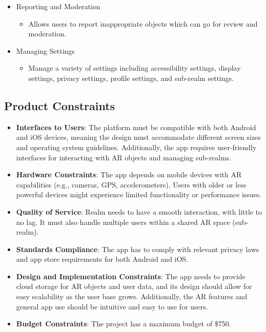 \documentclass{article}
\begin{document}
\begin{itemize}
    \item Reporting and Moderation
          \begin{itemize}
              \item Allows users to report inappropriate objects which can go for review and moderation.
          \end{itemize}

    \item Managing Settings
          \begin{itemize}
              \item Manage a variety of settings including accessibility settings, display settings, privacy settings, profile settings, and sub-realm settings.
          \end{itemize}
\end{itemize}
\subsection{Product Constraints}

\begin{itemize}
    \item \textbf{Interfaces to Users}: The platform must be compatible with both Android and iOS devices, meaning the design must accommodate different screen sizes and operating system guidelines. Additionally, the app requires user-friendly interfaces for interacting with AR objects and managing sub-realms.

    \item \textbf{Hardware Constraints}: The app depends on mobile devices with AR capabilities (e.g., cameras, GPS, accelerometers). Users with older or less powerful devices might experience limited functionality or performance issues.

    \item \textbf{Quality of Service}: Realm needs to have a smooth interaction, with little to no lag. It must also handle multiple users within a shared AR space (sub-realm).

    \item \textbf{Standards Compliance}: The app has to comply with relevant privacy laws and app store requirements for both Android and iOS.

    \item \textbf{Design and Implementation Constraints}: The app needs to provide cloud storage for AR objects and user data, and its design should allow for easy scalability as the user base grows. Additionally, the AR features and general app use should be intuitive and easy to use for users.

    \item \textbf{Budget Constraints}: The project has a maximum budget of \$750.
\end{itemize}
\end{document}
